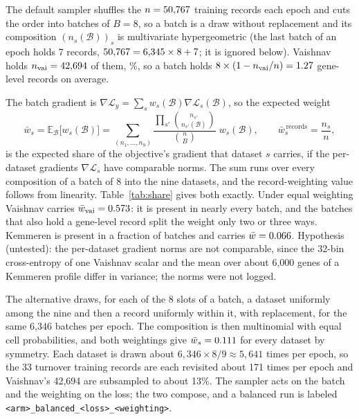 The default sampler shuffles the $n = 50{,}767$ training records each epoch and cuts the
order into batches of $B = 8$, so a batch is a draw without replacement and its composition
$(n_s(\mathcal{B}))_{s}$ is multivariate hypergeometric (the last batch of an epoch holds 7
records, $50{,}767 = 6{,}345 \times 8 + 7$; it is ignored below). Vaishnav holds
$n_{\mathrm{vai}} = 42{,}694$ of them, \tdVaishnavPct\%, so a batch holds
$8 \times (1 - n_{\mathrm{vai}}/n) = 1.27$ gene-level records on average.

The batch gradient is $\nabla \mathcal{L}_y = \sum_{s} w_s(\mathcal{B}) \nabla
\mathcal{L}_s(\mathcal{B})$, so the expected weight
\begin{equation}
\bar w_s = \mathbb{E}_{\mathcal{B}}\big[w_s(\mathcal{B})\big] =
\sum_{(n_1, \ldots, n_9)} \frac{\prod_{s'} \binom{n_{s'}}{n_{s'}(\mathcal{B})}}{\binom{n}{B}}\; w_s(\mathcal{B}),
\qquad
\bar w_s^{\,\mathrm{records}} = \frac{n_s}{n},
\label{eq:share}
\end{equation}
is the expected share of the objective's gradient that dataset $s$ carries, if the
per-dataset gradients $\nabla \mathcal{L}_s$ have comparable norms. The sum runs over every
composition of a batch of 8 into the nine datasets, and the record-weighting value follows
from linearity. Table~\ref{tab:share} gives both exactly. Under equal weighting Vaishnav
carries $\bar w_{\mathrm{vai}} = 0.573$: it is present in nearly every
batch, and the batches that also hold a gene-level record split the weight only two or three
ways. Kemmeren is present in a fraction \tdKemmerenPresent{} of batches and carries
$\bar w = 0.066$. Hypothesis (untested): the per-dataset gradient norms are
not comparable, since the 32-bin cross-entropy of one Vaishnav scalar and the mean over
about 6{,}000 genes of a Kemmeren profile differ in variance; the norms were not logged.

The alternative draws, for each of the 8 slots of a batch, a dataset uniformly among the
nine and then a record uniformly within it, with replacement, for the same 6{,}346 batches
per epoch. The composition is then multinomial with equal cell probabilities, and both
weightings give $\bar w_s = 0.111$ for every dataset by symmetry. Each dataset
is drawn about $6{,}346 \times 8 / 9 \approx 5{,}641$ times per epoch, so the 33 turnover
training records are each revisited about 171 times per epoch and Vaishnav's 42{,}694 are
subsampled to about 13\%. The sampler acts on the batch and the weighting on the loss; the
two compose, and a balanced run is labeled \texttt{<arm>\_balanced\_<loss>\_<weighting>}.

